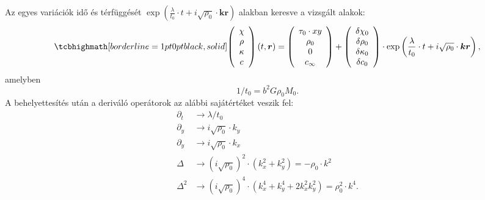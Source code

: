 \documentclass[10pt,a4paper]{scrartcl}
\let\mathbf\bm
\begin{document}
Az egyes variációk idő és térfüggését $\exp \left( {\frac{\lambda }{{{t_0}}} \cdot t + i\sqrt {{\rho _0}}  \cdot {\mathbf{kr}}} \right)$ alakban keresve a vizsgált alakok:
\begin{gather} \label{eq:perturbative_solution}
\tcbhighmath[borderline={1pt}{0pt}{black,solid}]{
\left( {\begin{array}{*{20}{c}}
  \chi  \\ 
  \rho  \\ 
  \kappa  \\ 
  c 
\end{array}} \right)\left( {t,{\mathbf{r}}} \right) = \left( {\begin{array}{*{20}{c}}
  {{\tau _0} \cdot xy} \\ 
  {{\rho _0}} \\ 
  0 \\ 
  {{c_\infty }} 
\end{array}} \right) + \left( {\begin{array}{*{20}{c}}
  {\delta {\chi _0}} \\ 
  {\delta {\rho _0}} \\ 
  {\delta {\kappa _0}} \\ 
  {\delta {c_0}} 
\end{array}} \right) \cdot \exp \left( {\frac{\lambda }{{{t_0}}} \cdot t + i\sqrt {{\rho _0}}  \cdot {\mathbf{kr}}} \right),}
\end{gather}
amelyben
\begin{equation} \label{eq:t_0_def}
1/{t_0} = {b^2}G{\rho _0}{M_0}.
\end{equation}
A behelyettesítés után a deriváló operátorok az alábbi sajátértéket veszik fel:
\[\begin{aligned}
  {\partial _t} &  \to \lambda /t_0 \\ 
  {\partial _y} &  \to i\sqrt {{\rho _0}}  \cdot {k_y} \\ 
  {\partial _y} &  \to i\sqrt {{\rho _0}}  \cdot {k_x} \\ 
  \Delta  &  \to {\left( {i\sqrt {{\rho _0}} } \right)^2} \cdot \left( {k_x^2 + k_y^2} \right) =  - {\rho _0} \cdot {k^2} \\ 
  {\Delta ^2} &  \to {\left( {i\sqrt {{\rho _0}} } \right)^4} \cdot \left( {k_x^4 + k_y^4 + 2k_x^2k_y^2} \right) = \rho _0^2 \cdot {k^4}. 
\end{aligned} \]
\end{document}
